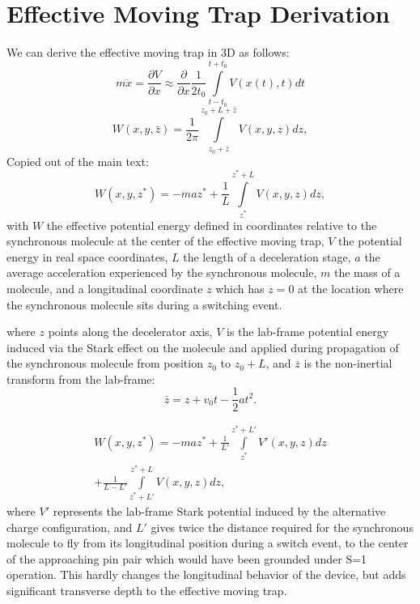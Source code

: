 \documentclass[%
 reprint,
 amsmath,amssymb,
 aps,
pra,
]{revtex4-1}
\begin{document}
\section{Effective Moving Trap Derivation\label{sec:effpot}}
We can derive the effective moving trap in 3D as follows:
\begin{equation}
m\ddot{x}=\frac{\partial V}{\partial x}\approx \frac{\partial}{\partial x}\frac{1}{2t_0}\int\limits_{t-t_0}^{t+t_0}V(x(t),t)dt
\end{equation}
\begin{equation}
W(x,y,\bar{z}) = \frac{1}{2\pi}\int\limits_{z_0+\bar{z}}^{z_0+L+\bar{z}}V(x,y,z)dz, 
\end{equation}
Copied out of the main text:
\begin{equation}
W(x,y,z^*) = - maz^* + \frac{1}{L}\int\limits_{z^*}^{z^*+L}V(x,y,z) dz,
\end{equation}
with $W$ the effective potential energy defined in coordinates relative to the synchronous molecule at the center of the effective moving trap, $V$ the potential energy in real space coordinates, $L$ the length of a deceleration stage, $a$ the average acceleration experienced by the synchronous molecule, $m$ the mass of a molecule, and a longitudinal coordinate $z$ which has $z=0$ at the location where the synchronous molecule sits during a switching event.

where $z$ points along the decelerator axis, $V$ is the lab-frame potential energy induced via the Stark effect on the molecule and applied during propagation of the synchronous molecule from position $z_0$ to $z_0+L$, and $\bar{z}$ is the non-inertial transform from the lab-frame: 
\begin{equation}
\bar{z} = z + v_0 t - \frac{1}{2}a t^2.
\end{equation}

\begin{multline}
W(x,y,z^*) = - maz^* + 
\frac{1}{L'}\!\!\int\limits_{z^*}^{z^*+L'}\!\!V'(x,y,z) dz \\
+\frac{1}{L-L'}\!\!\int\limits_{z^*+L'}^{z^*+L}\!\!V(x,y,z) dz,\hspace{2cm}
\end{multline}
where $V'$ represents the lab-frame Stark potential induced by the alternative charge configuration, and $L'$ gives twice the distance required for the synchronous molecule to fly from its longitudinal position during a switch event, to the center of the approaching pin pair which would have been grounded under S=1 operation. This hardly changes the longitudinal behavior of the device, but adds significant transverse depth to the effective moving trap.
\end{document}
